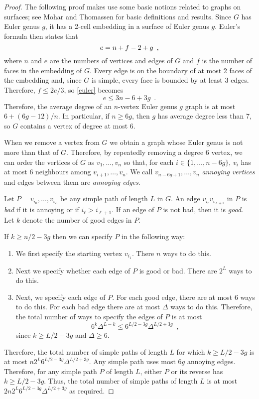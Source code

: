 \documentclass[lotsofwhite]{patmorin}
\begin{document}
\begin{proof}
   The following proof makes use some basic notions related to graphs
   on surfaces; see Mohar and Thomassen \cite{mohar.thomassen:graphs} for basic
   definitions and results.
   Since $G$ has Euler genus $g$, it has a 2-cell embedding in a surface
   of Euler genus $g$.  Euler's formula then states that 
   \begin{equation}
      e = n+f-2+g \enspace ,  \eqlabel{euler}
   \end{equation}
   where $n$ and $e$ are the numbers of vertices and edges of
   $G$ and $f$ is the number of faces in the embedding of $G$.  
   Every edge is on the boundary of at most 2 faces of the embedding
   and, since $G$ is simple, 
   every face is
   bounded by at least 3 edges.  Therefore, $f \le 2e/3$, so \eqref{euler}
   becomes
   \[
       e\le 3n-6+3g \enspace .
   \]
   Therefore, the average degree of an $n$-vertex Euler genus $g$ graph
   is at most $6+(6g-12)/n$.  In particular, if $n \ge 6g$, then $g$
   has average degree less than 7, so $G$ contains a vertex of degree
   at most $6$.
  
   When we remove a vertex from $G$ we obtain a graph whose Euler genus is
   not more than that of $G$.  Therefore, by repeatedly removing a degree
   6 vertex, we can order the vertices of $G$ as $v_1,\ldots,v_n$ so that,
   for each $i\in\{1,\ldots,n-6g\}$, $v_i$ has at most 6 neighbours among
   $v_{i+1},\ldots,v_n$.  We call $v_{n-6g+1},\ldots,v_n$ \emph{annoying
   vertices} and edges between them are \emph{annoying edges}.

   Let $P=v_{i_0},\ldots,v_{i_L}$ be any simple path of length $L$
   in $G$.  An edge $v_{i_\ell}v_{i_{\ell+1}}$ in $P$ is \emph{bad}
   if it is annoying or if $i_{\ell}>i_{\ell+1}$. If an edge of $P$
   is not bad, then it is \emph{good}.  Let $k$ denote the number of
   good edges in $P$.

   If $k\ge n/2-3g$ then we can specify $P$ in the following way:
   \begin{enumerate}
     \item We first specify the starting vertex $v_{i_1}$.  There $n$
       ways to do this.
     \item Next we specify whether each edge of $P$ is good or bad.
       There are $2^L$ ways to do this.
     \item Next, we specify each edge of $P$.  For each good edge,
       there are at most 6 ways to do this. For each bad edge there are 
       at most $\Delta$ ways to do this.
      Therefore, the total number of ways to specify the edges of $P$ is at most
      \[   6^k\Delta^{L-k} \le 6^{L/2-3g}\Delta^{L/2+3g}  \enspace ,\]
      since $k\ge L/2-3g$ and $\Delta\ge 6$.
   \end{enumerate}
   Therefore, the total number of simple paths of length $L$ for which
   $k\ge L/2-3g$ is at most $n2^L6^{L/2-3g}\Delta^{L/2+3g}$.  Any simple
   path uses most $6g$ annoying edges.  Therefore, for any simple path
   $P$ of length $L$, either $P$ or its reverse has $k\ge L/2-3g$.
   Thus, the total number of simple paths of length $L$ is at most
   $2n2^L6^{L/2-3g}\Delta^{L/2+3g}$ as required.
\end{proof}
\end{document}
